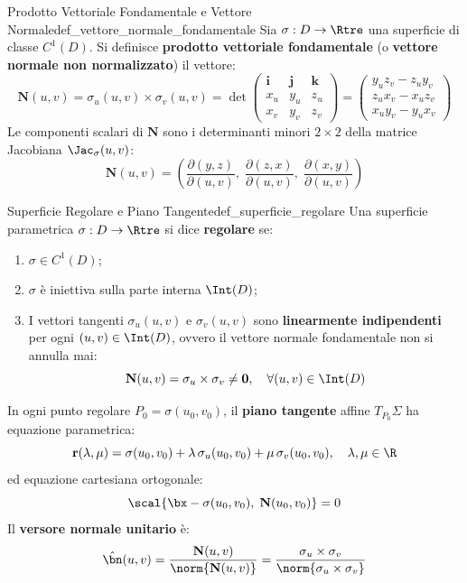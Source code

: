 \begin{definizione}{Prodotto Vettoriale Fondamentale e Vettore Normale}{def_vettore_normale_fondamentale}
Sia $\sigma: D \to \Rtre$ una superficie di classe $C^1(D)$. Si definisce \textbf{prodotto vettoriale fondamentale} (o \textbf{vettore normale non normalizzato}) il vettore:
\[
\mathbf{N}(u,v) = \sigma_u(u,v) \times \sigma_v(u,v) = \det \begin{pmatrix} \mathbf{i} & \mathbf{j} & \mathbf{k} \\ x_u & y_u & z_u \\ x_v & y_v & z_v \end{pmatrix} = \begin{pmatrix} y_u z_v - z_u y_v \\ z_u x_v - x_u z_v \\ x_u y_v - y_u x_v \end{pmatrix}
\]
Le componenti scalari di $\mathbf{N}$ sono i determinanti minori $2 \times 2$ della matrice Jacobiana $\Jac_\sigma(u,v)$:
\[
\mathbf{N}(u,v) = \left( \frac{\partial(y,z)}{\partial(u,v)}, \; \frac{\partial(z,x)}{\partial(u,v)}, \; \frac{\partial(x,y)}{\partial(u,v)} \right)
\]
\end{definizione}

\begin{definizione}{Superficie Regolare e Piano Tangente}{def_superficie_regolare}
Una superficie parametrica $\sigma: D \to \Rtre$ si dice \textbf{regolare} se:
\begin{enumerate}
    \item $\sigma \in C^1(D)$;
    \item $\sigma$ è iniettiva sulla parte interna $\Int(D)$;
    \item I vettori tangenti $\sigma_u(u,v)$ e $\sigma_v(u,v)$ sono \textbf{linearmente indipendenti} per ogni $(u,v) \in \Int(D)$, ovvero il vettore normale fondamentale non si annulla mai:
    \[
    \mathbf{N}(u,v) = \sigma_u \times \sigma_v \neq \mathbf{0}, \quad \forall (u,v) \in \Int(D)
    \]
\end{enumerate}
In ogni punto regolare $P_0 = \sigma(u_0, v_0)$, il \textbf{piano tangente} affine $T_{P_0}\Sigma$ ha equazione parametrica:
\[
\mathbf{r}(\lambda, \mu) = \sigma(u_0, v_0) + \lambda \, \sigma_u(u_0, v_0) + \mu \, \sigma_v(u_0, v_0), \quad \lambda, \mu \in \R
\]
ed equazione cartesiana ortogonale:
\[
\scal{\bx - \sigma(u_0, v_0), \; \mathbf{N}(u_0, v_0)} = 0
\]
Il \textbf{versore normale unitario} è:
\[
\hat{\bn}(u,v) = \frac{\mathbf{N}(u,v)}{\norm{\mathbf{N}(u,v)}} = \frac{\sigma_u \times \sigma_v}{\norm{\sigma_u \times \sigma_v}}
\]
\end{definizione}

